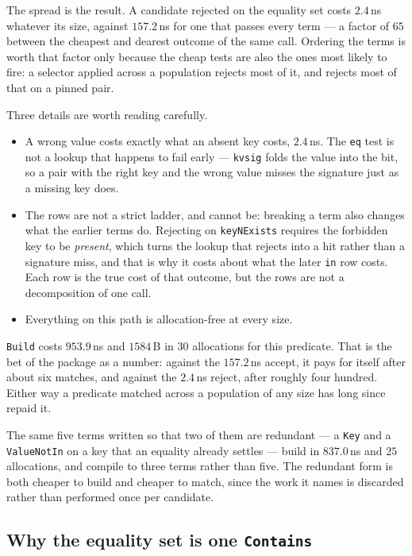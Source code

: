 \documentclass[11pt]{article}
\newcommand{\code}[1]{\texttt{#1}}
\begin{document}
The spread is the result. A candidate rejected on the equality set costs
$2.4$\,ns whatever its size, against $157.2$\,ns for one that passes every term
--- a factor of $65$ between the cheapest and dearest outcome of the same call.
Ordering the terms is worth that factor only because the cheap tests are also
the ones most likely to fire: a selector applied across a population rejects
most of it, and rejects most of that on a pinned pair.

Three details are worth reading carefully.

\begin{itemize}
  \item A wrong value costs exactly what an absent key costs, $2.4$\,ns. The
    \code{eq} test is not a lookup that happens to fail early --- \code{kvsig}
    folds the value into the bit, so a pair with the right key and the wrong
    value misses the signature just as a missing key does.
  \item The rows are not a strict ladder, and cannot be: breaking a term also
    changes what the earlier terms do. Rejecting on \code{keyNExists} requires
    the forbidden key to be \emph{present}, which turns the lookup that rejects
    into a hit rather than a signature miss, and that is why it costs about what
    the later \code{in} row costs. Each row is the true cost of that outcome,
    but the rows are not a decomposition of one call.
  \item Everything on this path is allocation-free at every size.
\end{itemize}

\code{Build} costs $953.9$\,ns and $1584$\,B in $30$ allocations for this
predicate. That is the bet of the package as a number: against the $157.2$\,ns
accept, it pays for itself after about six matches, and against the $2.4$\,ns
reject, after roughly four hundred. Either way a predicate matched across a
population of any size has long since repaid it.

The same five terms written so that two of them are redundant --- a \code{Key}
and a \code{ValueNotIn} on a key that an equality already settles --- build in
$837.0$\,ns and $25$ allocations, and compile to three terms rather than five.
The redundant form is both cheaper to build and cheaper to match, since the work
it names is discarded rather than performed once per candidate.

\subsection{Why the equality set is one \code{Contains}}
\end{document}
